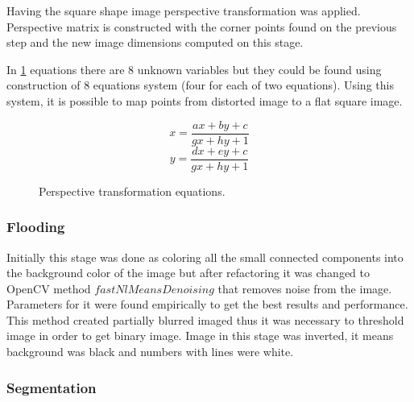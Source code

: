 \documentclass[../../main]{subfiles}
\begin{document}
Having the square shape image perspective transformation was applied. Perspective matrix is constructed with the corner points found on the previous step and the new image dimensions computed on this stage.

In \ref{eq:persptransform} equations there are 8 unknown variables but they could be found using construction of 8 equations system (four for each of two equations). Using this system, it is possible to map points from distorted image to a flat square image.

\begin{figure} [!ht]
  \centering    
    \begin{equation}
        x = \frac{ax+by+c}{gx+hy+1}
    \end{equation}
     \begin{equation}
        y = \frac{dx+ey+c}{gx+hy+1}
    \end{equation}
  \caption{Perspective transformation equations.}
  \label{eq:persptransform}
\end{figure}

\subsubsection{Flooding}

Initially this stage was done as coloring all the small connected components into the background color of the image but after refactoring it was changed to \ac{OpenCV} method $fastNlMeansDenoising$ that removes noise from the image. Parameters for it were found empirically to get the best results and performance. This method created partially blurred imaged thus it was necessary to threshold image in order to get binary image. Image in this stage was inverted, it means background was black and numbers with lines were white.

\subsubsection{Segmentation}
\end{document}
